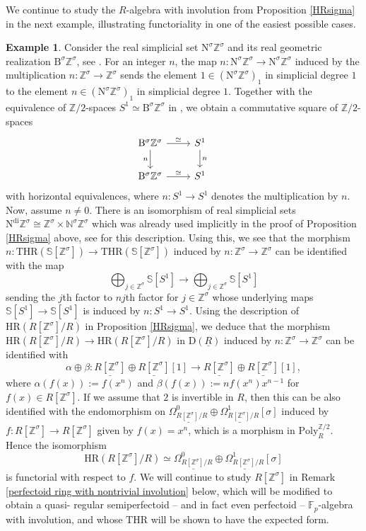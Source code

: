 \documentclass[10pt]{amsart}
\theoremstyle{definition}
\newtheorem{exm}[thm]{Example}
\numberwithin{equation}{section}
\newcommand{\F}{\mathbb{F}}
\newcommand{\N}{\mathbb{N}}
\newcommand{\Sphere}{\mathbb{S}}
\newcommand{\Z}{\mathbb{Z}}
\newcommand{\rB}{\mathrm{B}}
\newcommand{\rD}{\mathrm{D}}
\newcommand{\rN}{\mathrm{N}}
\newcommand{\ul}{\underline}
\newcommand{\Poly}{\mathrm{Poly}}
\newcommand{\HR}{\mathrm{HR}}
\newcommand{\THR}{\mathrm{THR}}
\newcommand{\Ndi}{\mathrm{N}^\mathrm{di}}
\begin{document}
We continue to study the $R$-algebra with involution from Proposition \ref{HRsigma} in the next example, illustrating  functoriality in one of the easiest possible cases.

\begin{exm}\label{thrgm}
Consider the real simplicial set $\rN^\sigma \Z^\sigma$ and its real geometric realization $\rB^\sigma \Z^\sigma$, see \cite[Definition 4.2.1]{HP23}.
For an integer $n$,
the map $n\colon \rN^\sigma \Z^\sigma\to \rN^\sigma \Z^\sigma$ induced by the multiplication $n\colon \Z^\sigma \to \Z^\sigma$ sends the element $1\in (\rN^\sigma \Z^\sigma)_1$ in simplicial degree $1$ to the element $n\in (\rN^\sigma \Z^\sigma)_1$ in simplicial degree $1$.
Together with the equivalence of $\Z/2$-spaces $S^1\simeq \rB^\sigma \Z^\sigma$ in \cite[Example 5.13]{DMPR21},
we obtain a commutative square of $\Z/2$-spaces
\[
\begin{tikzcd}
\rB^\sigma \Z^\sigma\ar[d,"n"']\ar[r,"\simeq"]&
S^1\ar[d,"n"]&
\\
\rB^\sigma \Z^\sigma\ar[r,"\simeq"]&
S^1
\end{tikzcd}
\]
with horizontal equivalences,
where $n\colon S^1\to S^1$ denotes the multiplication by $n$.
Now, assume $n\neq 0$.
There is an isomorphism of real simplicial sets $\Ndi \Z^\sigma \cong \Z^\sigma \times \N^\sigma \Z^\sigma$ which was already used implicitly in the proof of Proposition \ref{HRsigma} above,
see \cite[proof of Proposition 4.2.6]{HP23} for this description.
Using this,
we see that the morphism $n\colon \THR(\Sphere[\Z^\sigma])\to \THR(\Sphere[\Z^\sigma])$ induced by $n\colon \Z^\sigma\to \Z^\sigma$ can be identified with the map
\[
\bigoplus_{j \in \Z^\sigma} \Sphere[S^1]
\to
 \bigoplus_{j \in \Z^\sigma} \Sphere[S^1]
\]
sending the $j$th factor to $nj$th factor for $j\in \Z^\sigma$ whose underlying maps $\Sphere[S^1]\to \Sphere[S^1]$ is induced by $n\colon S^1\to S^1$.
Using the description of $\HR(R[\Z^\sigma]/R)$ in Proposition \ref{HRsigma},
we deduce that the morphism $\HR(R[\Z^\sigma]/R)\to \HR(R[\Z^\sigma]/R)$ in $\rD(\ul{R})$ induced by $n\colon \Z^\sigma\to \Z^\sigma$ can be identified with
\[
\alpha \oplus \beta\colon \ul{R[\Z^\sigma]}\oplus \ul{R[\Z^\sigma]}[1]\to \ul{R[\Z^\sigma]}\oplus \ul{R[\Z^\sigma]}[1],
\]
where
$\alpha(f(x)):=f(x^n)$ and $\beta(f(x)):=n f(x^n)x^{n-1}$ for $f(x)\in R[\Z^\sigma]$.
If we assume that $2$ is invertible in $R$,
then this can be also identified with the endomorphism on $\ul{\Omega_{R[\Z^\sigma]/R}^0}\oplus \ul{\Omega_{R[\Z^\sigma]/R}^1}[\sigma]$ induced by $f\colon R[\Z^\sigma]\to R[\Z^\sigma]$ given by $f(x)=x^n$, which is a morphism in $\Poly_R^{\Z/2}$.
Hence the isomorphism 
$$\HR(R[\Z^\sigma]/R)
\simeq  \ul{\Omega_{R[\Z^\sigma]/R}^0} \oplus \ul{\Omega_{R[\Z^\sigma]/R}^1}[\sigma]$$
is functorial with respect to $f$.
We will continue to study $R[\Z^{\sigma}]$ in Remark \ref{perfectoid ring with nontrivial involution} below, which will be modified to obtain a quasi-
regular semiperfectoid – and in fact even perfectoid – $\F_p$-algebra with involution, and whose $\THR$ will be shown to have the expected form.
\end{exm}
\end{document}

